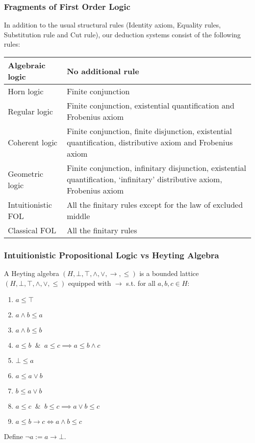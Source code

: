\documentclass[UTF8,aspectratio=43,11pt,colorlinks,compress,openany]{beamer}%
\begin{document}
\begin{frame}\frametitle{Fragments of First Order Logic}
In addition to the usual structural rules (Identity axiom, Equality rules, Substitution rule and Cut rule), our deduction systems consist of the following rules:\\
\centering
\begin{tabu}{|p{.23\textwidth}|p{.67\textwidth}|}
\hline
	Algebraic logic &No additional rule\\
\hline
Horn logic &Finite conjunction\\
\hline
Regular logic &Finite conjunction, existential quantification and Frobenius axiom\\
\hline
	Coherent logic &Finite conjunction, finite disjunction, existential quantification, distributive axiom and Frobenius axiom\\
\hline
	Geometric logic &Finite conjunction, infinitary disjunction, existential quantification, `infinitary' distributive axiom, Frobenius axiom\\
\hline
Intuitionistic FOL &All the finitary rules except for the law of excluded middle\\
\hline
	Classical FOL &All the finitary rules\\
\hline
\end{tabu}
\end{frame}

\begin{frame}\frametitle{Intuitionistic Propositional Logic vs Heyting Algebra}
A Heyting algebra $(H,\bot,\top,\wedge,\vee,\to,\leq)$ is a bounded lattice $(H,\bot,\top,\wedge,\vee,\leq)$ equipped with $\to$ s.t. for all $a,b,c\in H$:
\begin{enumerate}
	\item $a\leq \top$
	\item $a\wedge b\leq a$
	\item $a\wedge b\leq b$
	\item $a\leq b\;\;\&\;\;a\leq c\implies a\leq b\wedge c$
	\item $\bot\leq a$
	\item $a\leq a\vee b$
	\item $b\leq a\vee b$
	\item $a\leq c\;\;\&\;\;b\leq c\implies a\vee b\leq c$
	\item $a\leq b\to c\iff a\wedge b\leq c$
\end{enumerate}
Define $\neg a:=a\to\bot$.
\end{frame}
\end{document}
